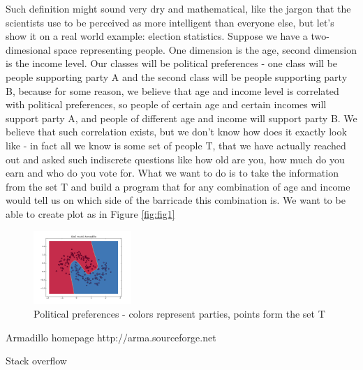 \documentclass[3p,twocolumn]{elsarticle}
\begin{document}
Such definition might sound very dry and mathematical, like the jargon that the scientists use to be perceived as more intelligent than everyone else, but let's show it on a real world example: election statistics. Suppose we have a two-dimesional space representing people. One dimension is the age, second dimension is the income level. Our classes will be political preferences - one class will be people supporting party A and the second class will be people supporting party B, because for some reason, we believe that age and income level is correlated with political preferences, so people of certain age and certain incomes will support party A, and people of different age and income will support party B. We believe that such correlation exists, but we don't know how does it exactly look like - in fact all we know is some set of people T, that we have actually reached out and asked such indiscrete questions like how old are you, how much do you earn and who do you vote for. What we want to do is to take the information from the set T and build a program that for any combination of age and income would tell us on which side of the barricade this combination is. We want to be able to create plot as in Figure \ref{fig:fig1}

\begin{figure}[fig1]
	
\label{fig:fig1}
  \includegraphics[width=0.33\textwidth]{figure_1.png}
	\caption{Political preferences - colors represent parties, points form the set T}
	\label{fig1}
\end{figure}






%

 \begin{thebibliography}{00}

%

  Armadillo homepage http://arma.sourceforge.net
 
  Stack overflow

 \end{thebibliography}
\end{document}
